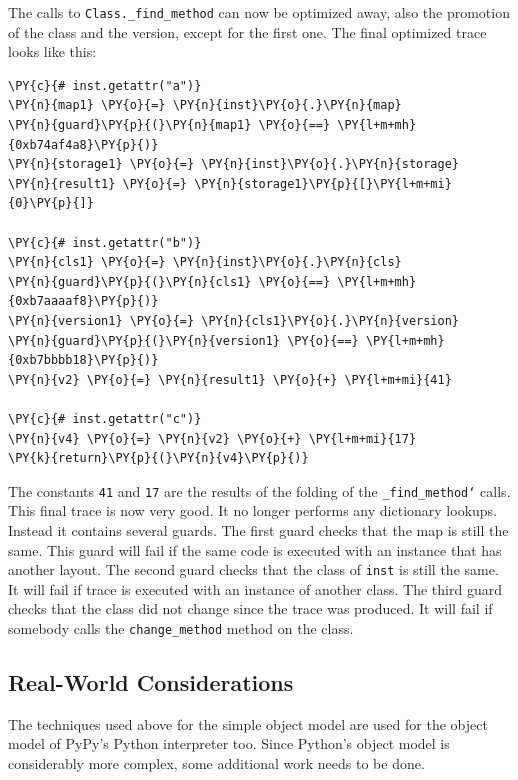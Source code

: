 \documentclass{sig-alternate}
\begin{document}
The calls to \texttt{Class.\_find\_method} can now be optimized away, also the
promotion of the class and the version, except for the first one. The final
optimized trace looks like this:
\begin{Verbatim}[commandchars=\\\{\}]
\PY{c}{# inst.getattr("a")}
\PY{n}{map1} \PY{o}{=} \PY{n}{inst}\PY{o}{.}\PY{n}{map}
\PY{n}{guard}\PY{p}{(}\PY{n}{map1} \PY{o}{==} \PY{l+m+mh}{0xb74af4a8}\PY{p}{)}
\PY{n}{storage1} \PY{o}{=} \PY{n}{inst}\PY{o}{.}\PY{n}{storage}
\PY{n}{result1} \PY{o}{=} \PY{n}{storage1}\PY{p}{[}\PY{l+m+mi}{0}\PY{p}{]}

\PY{c}{# inst.getattr("b")}
\PY{n}{cls1} \PY{o}{=} \PY{n}{inst}\PY{o}{.}\PY{n}{cls}
\PY{n}{guard}\PY{p}{(}\PY{n}{cls1} \PY{o}{==} \PY{l+m+mh}{0xb7aaaaf8}\PY{p}{)}
\PY{n}{version1} \PY{o}{=} \PY{n}{cls1}\PY{o}{.}\PY{n}{version}
\PY{n}{guard}\PY{p}{(}\PY{n}{version1} \PY{o}{==} \PY{l+m+mh}{0xb7bbbb18}\PY{p}{)}
\PY{n}{v2} \PY{o}{=} \PY{n}{result1} \PY{o}{+} \PY{l+m+mi}{41}

\PY{c}{# inst.getattr("c")}
\PY{n}{v4} \PY{o}{=} \PY{n}{v2} \PY{o}{+} \PY{l+m+mi}{17}
\PY{k}{return}\PY{p}{(}\PY{n}{v4}\PY{p}{)}
\end{Verbatim}

The constants \texttt{41} and \texttt{17} are the results of the folding of the
\texttt{\_find\_method`} calls. This final trace is now very good. It no longer performs any
dictionary lookups. Instead it contains several guards. The first guard
checks that the map is still the same. This guard will fail if the same
code is executed with an instance that has another layout. The second guard
checks that the class of \texttt{inst} is still the same. It will fail if trace is
executed with an instance of another class. The third guard checks that the
class did not change since the trace was produced. It will fail if somebody
calls the \texttt{change\_method} method on the class.



\subsection{Real-World Considerations}

The techniques used above for the simple object model are used for the object
model of PyPy's Python interpreter too. Since Python's object model is
considerably more complex, some additional work needs to be done.
\end{document}
